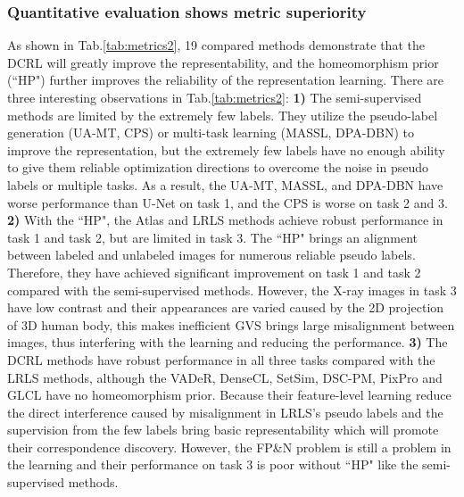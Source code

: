 \subsubsection{Quantitative evaluation shows metric superiority}
As shown in Tab.\ref{tab:metrics2}, 19 compared methods demonstrate that the DCRL will greatly improve the representability, and the homeomorphism prior (``HP") further improves the reliability of the representation learning. There are three interesting observations in Tab.\ref{tab:metrics2}: \textbf{1)} The semi-supervised methods are limited by the extremely few labels. They utilize the pseudo-label generation (UA-MT, CPS) or multi-task learning (MASSL, DPA-DBN) to improve the representation, but the extremely few labels have no enough ability to give them reliable optimization directions to overcome the noise in pseudo labels or multiple tasks. As a result, the UA-MT, MASSL, and DPA-DBN have worse performance than U-Net on task 1, and the CPS is worse on task 2 and 3. \textbf{2)} With the ``HP", the Atlas and LRLS methods achieve robust performance in task 1 and task 2, but are limited in task 3. The ``HP" brings an alignment between labeled and unlabeled images for numerous reliable pseudo labels. Therefore, they have achieved significant improvement on task 1 and task 2 compared with the semi-supervised methods. However, the X-ray images in task 3 have low contrast and their appearances are varied caused by the 2D projection of 3D human body, this makes inefficient GVS brings large misalignment between images, thus interfering with the learning and reducing the performance. \textbf{3)} The DCRL methods have robust performance in all three tasks compared with the LRLS methods, although the VADeR, DenseCL, SetSim, DSC-PM, PixPro and GLCL have no homeomorphism prior. Because their feature-level learning reduce the direct interference caused by misalignment in LRLS's pseudo labels and the supervision from the few labels bring basic representability which will promote their correspondence discovery. However, the FP\&N problem is still a problem in the learning and their performance on task 3 is poor without ``HP" like the semi-supervised methods.

